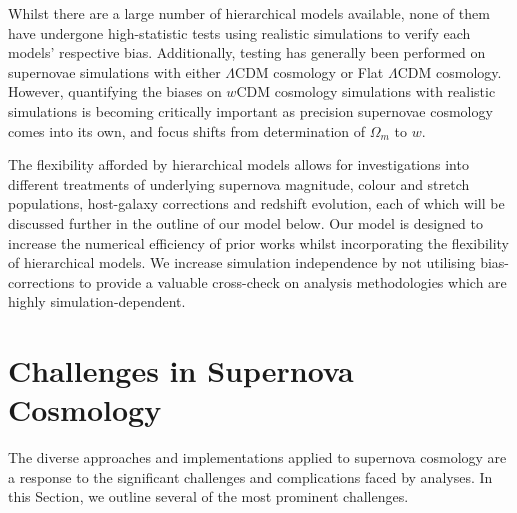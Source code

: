 \documentclass[a4paper,fleqn,usenatbib]{mnras}
\newcommand{\green}{\color{forestgreen}}
\begin{document}
Whilst there are a large number of hierarchical models available, none of them have undergone high-statistic tests using realistic simulations to verify each models' respective bias. {\green Additionally, testing has generally been performed on supernovae simulations with either $\Lambda$CDM cosmology or Flat $\Lambda$CDM cosmology. However, quantifying the biases on $w$CDM cosmology simulations with realistic simulations is becoming critically important as precision supernovae cosmology comes into its own, and focus shifts from determination of $\Omega_m$ to $w$.}


The flexibility afforded by hierarchical models allows for investigations into different treatments of underlying supernova magnitude, colour and stretch populations, host-galaxy corrections and redshift evolution, each of which will be discussed further in the outline of our model below. Our model is designed to increase the numerical efficiency of prior works whilst incorporating the flexibility of hierarchical models. {\green We increase simulation independence by not utilising bias-corrections} to provide a valuable cross-check on analysis methodologies which are highly simulation-dependent.





\section{Challenges in Supernova Cosmology}
\label{sec:challenges}


{\green The diverse approaches and implementations applied to supernova cosmology are a response to the significant challenges and complications faced by analyses.} In this Section, we outline several of the most prominent challenges. 
\end{document}
